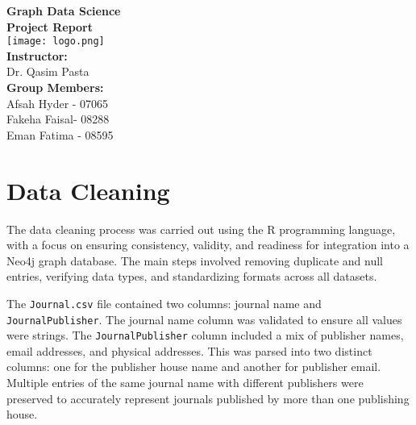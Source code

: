 \documentclass{article}
\theoremstyle{mytheoremstyle}
\theoremstyle{mytheoremstyle}
\theoremstyle{myproblemstyle}
\begin{document}
\begin{titlepage}
    \centering
    \vspace*{1cm}
    
    {\Huge \textbf{Graph Data Science}}\\[1.5cm]
    
    {\LARGE \textbf{Project Report}}\\[0.3cm]
    
    \texttt{[image: logo.png]}\\[1cm]
    
    {\Large \textbf{Instructor:}}\\
    {\large Dr. Qasim Pasta}\\[1cm]
    
    {\large \textbf{Group Members:}}\\[0.5cm]
    {\large Afsah Hyder - 07065}\\
    {\large Fakeha Faisal- 08288}\\
    {\large Eman Fatima - 08595}\\[2cm]
        
\end{titlepage}


\maketitle
\section{Data Cleaning}
The data cleaning process was carried out using the R programming language, with a focus on ensuring consistency, validity, and readiness for integration into a Neo4j graph database. The main steps involved removing duplicate and null entries, verifying data types, and standardizing formats across all datasets.

The \texttt{Journal.csv} file contained two columns: journal name and \texttt{JournalPublisher}. The journal name column was validated to ensure all values were strings. The \texttt{JournalPublisher} column included a mix of publisher names, email addresses, and physical addresses. This was parsed into two distinct columns: one for the publisher house name and another for publisher email. Multiple entries of the same journal name with different publishers were preserved to accurately represent journals published by more than one publishing house.
\end{document}

